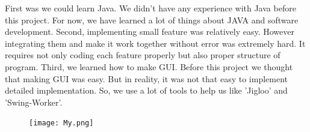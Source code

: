 \documentclass[10pt,journal,compsoc]{IEEEtran}
\begin{document}
First was we could learn Java. We didn’t have any experience with Java before this project. For now, we have learned a lot of things about JAVA and software development.
Second, implementing small feature was relatively easy. However integrating them and make it work together without error was extremely hard. It requires not only coding each feature properly but also proper structure of program.
Third, we learned how to make GUI. Before this project we thought that making GUI was easy. But in reality, it was not that easy to implement detailed implementation. So, we use a lot of tools to help us like 'Jigloo' and 'Swing-Worker'.
\clearpage
\begin{figure}[H]
\texttt{[image: My.png]}
\caption{}
\end{figure}
















%
%

\end{document}
